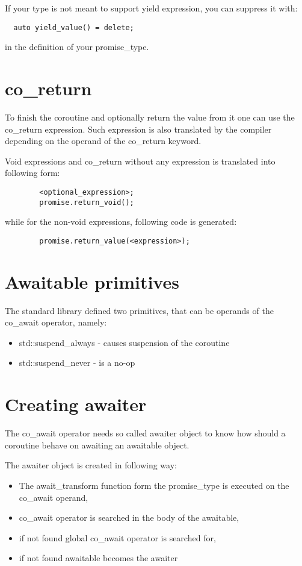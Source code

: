 \documentclass[twoside,twocolumn, 10pt]{article}
\begin{document}
	If your type is not meant to support yield
	expression, you can suppress it with:

\begin{verbatim}
  auto yield_value() = delete;
\end{verbatim}

  in the definition of your promise\_type.

\section{co\_return}
	To finish the coroutine and optionally return the value from it
	one can use the co\_return expression. Such expression is also
	translated by the compiler depending on the operand of the
	co\_return keyword.

	Void expressions and co\_return without any expression is
	translated into following form:
	\begin{verbatim}
		<optional_expression>;
		promise.return_void();
	\end{verbatim}

	while for the non-void expressions, following code is generated:

	\begin{verbatim}
		promise.return_value(<expression>);
	\end{verbatim}

	\section{Awaitable primitives}

	The standard library defined two primitives, that can be
	operands of the co\_await operator, namely:
	\begin{itemize}
		\item std::suspend\_always - causes suspension of the coroutine
		\item std::suspend\_never - is a no-op
	\end{itemize}

	\section{Creating awaiter}

	The co\_await operator needs so called awaiter object to know
	how should a coroutine behave on awaiting an awaitable object.

	The awaiter object is created in following way:

	\begin{itemize}
		\item The await\_transform function form the
		 promise\_type is executed on the co\_await operand,
		\item co\_await operator is searched in the body of the awaitable,
		\item if not found global co\_await operator is searched for,
		\item if not found awaitable becomes the awaiter
	\end{itemize}
\end{document}
